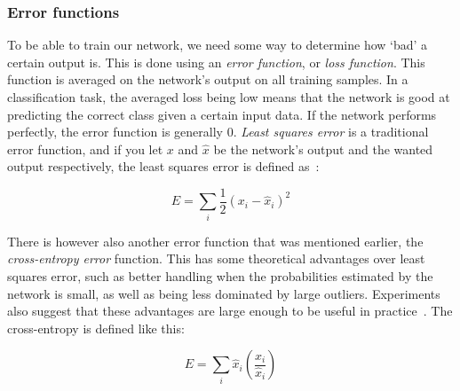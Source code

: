 \documentclass{kththesis}
\begin{document}
\subsubsection{Error functions}
To be able to train our network, we need some way to determine how `bad' a certain output is. This is done using an \textit{error function}, or \textit{loss function}. This function is averaged on the network's output on all training samples. In a classification task, the averaged loss being low means that the network is good at predicting the correct class given a certain input data. If the network performs perfectly, the error function is generally $0$. \textit{Least squares error} is a traditional error function, and if you let $x$ and $\hat{x}$ be the network's output and the wanted output respectively, the least squares error is defined as~\cite{mlfIntro}:

\[ E = \sum_i{\frac{1}{2}(x_i - \hat{x}_i)^2} \] 

There is however also another error function that was mentioned earlier, the \textit{cross-entropy error} function. This has some theoretical advantages over least squares error, such as better handling when the probabilities estimated by the network is small, as well as being less dominated by large outliers. Experiments also suggest that these advantages are large enough to be useful in practice~\cite{crossentropy_squared}. The cross-entropy is defined like this:

\[ E = \sum_i{\hat{x}_i\left(\frac{x_i}{\hat{x}_i}\right)} \]
\end{document}
